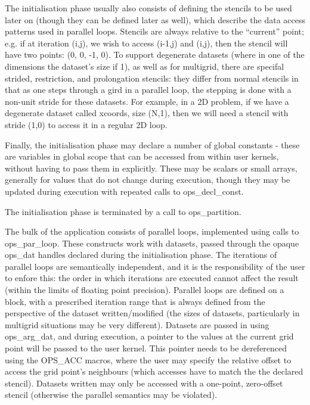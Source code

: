 \documentclass[11pt]{article}
\begin{document}
The initialisation phase usually also consists of defining the stencils to be used later on (though they can be defined later as well),
which describe the data access patterns used in parallel loops. Stencils are always relative to the ``current'' point; e.g. if
at iteration (i,j), we wish to access (i-1,j) and (i,j), then the stencil will have two points: (0, 0, -1, 0). To 
support degenerate datasets (where in one of the dimensions the dataset's size if 1), as well as for multigrid, there are
specifal strided, restriction, and prolongation stencils: they differ from normal stencils in that as one steps through a
gird in a parallel loop, the stepping is done with a non-unit stride for these datasets. For example, in a 2D problem, if
we have a degenerate dataset called xcoords, size (N,1), then we will need a stencil with stride (1,0) to access it in a
regular 2D loop.

Finally, the initialisation phase may declare a number of global constants - these are variables in global scope that can 
be accessed from within user kernels, without having to pass them in explicitly. These may be scalars or small arrays, 
generally for values that do not change during execution, though they may be updated during execution with repeated calls
to ops\_decl\_const. 

The initialisation phase is terminated by a call to ops\_partition.

The bulk of the application consists of parallel loops, implemented using calls to ops\_par\_loop. These constructs work with datasets, passed through the opaque ops\_dat handles declared during the initialisation phase. The iterations of parallel loops are semantically independent, and it is the responsibility of the user to enfore this: the order in which iterations are executed cannot affect the result (within the limits of floating point precision). Parallel loops are defined on a block, with a prescribed iteration range that is always defined from the perspective of the dataset written/modified (the sizes of datasets, particularly in multigrid situations may be very different). Datasets are passed in using ops\_arg\_dat, and during execution, a pointer to the values at the current grid point will be passed to the user kernel. This pointer needs to be dereferenced using the OPS\_ACC macros, where the user may specify the relative offset to access the grid point's neighbours (which accesses have to match the the declared stencil). Datasets written may only be accessed with a one-point, zero-offset stencil (otherwise the parallel semantics may be violated).
\end{document}
